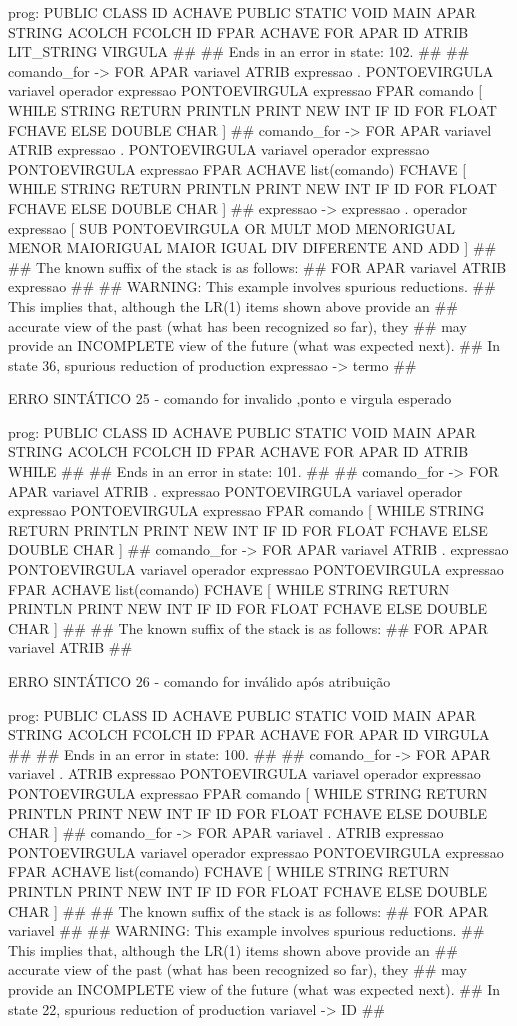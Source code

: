 \documentclass[12pt,a4paper,twoside]{report}
\begin{document}
\begin{terminal}
prog: PUBLIC CLASS ID ACHAVE PUBLIC STATIC VOID MAIN APAR STRING ACOLCH FCOLCH ID FPAR ACHAVE FOR APAR ID ATRIB LIT_STRING VIRGULA 
##
## Ends in an error in state: 102.
##
## comando_for -> FOR APAR variavel ATRIB expressao . PONTOEVIRGULA variavel operador expressao PONTOEVIRGULA expressao FPAR comando [ WHILE STRING RETURN PRINTLN PRINT NEW INT IF ID FOR FLOAT FCHAVE ELSE DOUBLE CHAR ]
## comando_for -> FOR APAR variavel ATRIB expressao . PONTOEVIRGULA variavel operador expressao PONTOEVIRGULA expressao FPAR ACHAVE list(comando) FCHAVE [ WHILE STRING RETURN PRINTLN PRINT NEW INT IF ID FOR FLOAT FCHAVE ELSE DOUBLE CHAR ]
## expressao -> expressao . operador expressao [ SUB PONTOEVIRGULA OR MULT MOD MENORIGUAL MENOR MAIORIGUAL MAIOR IGUAL DIV DIFERENTE AND ADD ]
##
## The known suffix of the stack is as follows:
## FOR APAR variavel ATRIB expressao 
##
## WARNING: This example involves spurious reductions.
## This implies that, although the LR(1) items shown above provide an
## accurate view of the past (what has been recognized so far), they
## may provide an INCOMPLETE view of the future (what was expected next).
## In state 36, spurious reduction of production expressao -> termo 
##

ERRO SINTÁTICO 25 -  comando for invalido ,ponto e virgula esperado

prog: PUBLIC CLASS ID ACHAVE PUBLIC STATIC VOID MAIN APAR STRING ACOLCH FCOLCH ID FPAR ACHAVE FOR APAR ID ATRIB WHILE 
##
## Ends in an error in state: 101.
##
## comando_for -> FOR APAR variavel ATRIB . expressao PONTOEVIRGULA variavel operador expressao PONTOEVIRGULA expressao FPAR comando [ WHILE STRING RETURN PRINTLN PRINT NEW INT IF ID FOR FLOAT FCHAVE ELSE DOUBLE CHAR ]
## comando_for -> FOR APAR variavel ATRIB . expressao PONTOEVIRGULA variavel operador expressao PONTOEVIRGULA expressao FPAR ACHAVE list(comando) FCHAVE [ WHILE STRING RETURN PRINTLN PRINT NEW INT IF ID FOR FLOAT FCHAVE ELSE DOUBLE CHAR ]
##
## The known suffix of the stack is as follows:
## FOR APAR variavel ATRIB 
##

ERRO SINTÁTICO 26 -  comando for inválido após atribuição

prog: PUBLIC CLASS ID ACHAVE PUBLIC STATIC VOID MAIN APAR STRING ACOLCH FCOLCH ID FPAR ACHAVE FOR APAR ID VIRGULA 
##
## Ends in an error in state: 100.
##
## comando_for -> FOR APAR variavel . ATRIB expressao PONTOEVIRGULA variavel operador expressao PONTOEVIRGULA expressao FPAR comando [ WHILE STRING RETURN PRINTLN PRINT NEW INT IF ID FOR FLOAT FCHAVE ELSE DOUBLE CHAR ]
## comando_for -> FOR APAR variavel . ATRIB expressao PONTOEVIRGULA variavel operador expressao PONTOEVIRGULA expressao FPAR ACHAVE list(comando) FCHAVE [ WHILE STRING RETURN PRINTLN PRINT NEW INT IF ID FOR FLOAT FCHAVE ELSE DOUBLE CHAR ]
##
## The known suffix of the stack is as follows:
## FOR APAR variavel 
##
## WARNING: This example involves spurious reductions.
## This implies that, although the LR(1) items shown above provide an
## accurate view of the past (what has been recognized so far), they
## may provide an INCOMPLETE view of the future (what was expected next).
## In state 22, spurious reduction of production variavel -> ID 
##


\end{terminal}
\end{document}
